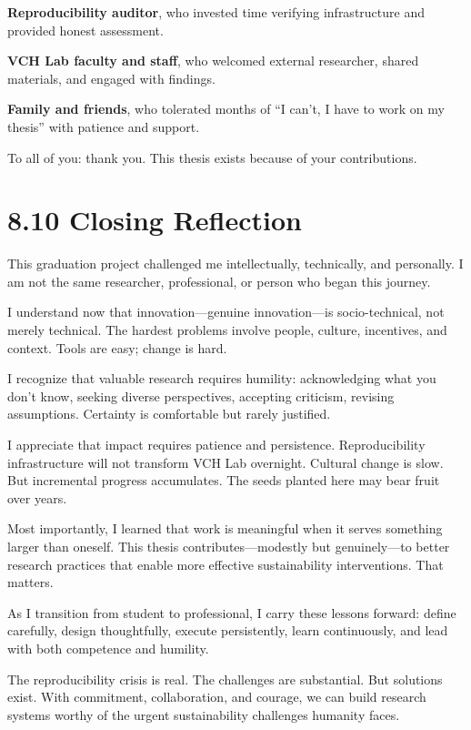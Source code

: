 \documentclass[
  oneside,
  open=any]{scrbook}
\begin{document}
\textbf{Reproducibility auditor}, who invested time verifying
infrastructure and provided honest assessment.

\textbf{VCH Lab faculty and staff}, who welcomed external researcher,
shared materials, and engaged with findings.

\textbf{Family and friends}, who tolerated months of ``I can't, I have
to work on my thesis'' with patience and support.

To all of you: thank you. This thesis exists because of your
contributions.

\section{8.10 Closing Reflection}\label{closing-reflection}

This graduation project challenged me intellectually, technically, and
personally. I am not the same researcher, professional, or person who
began this journey.

I understand now that innovation---genuine innovation---is
socio-technical, not merely technical. The hardest problems involve
people, culture, incentives, and context. Tools are easy; change is
hard.

I recognize that valuable research requires humility: acknowledging what
you don't know, seeking diverse perspectives, accepting criticism,
revising assumptions. Certainty is comfortable but rarely justified.

I appreciate that impact requires patience and persistence.
Reproducibility infrastructure will not transform VCH Lab overnight.
Cultural change is slow. But incremental progress accumulates. The seeds
planted here may bear fruit over years.

Most importantly, I learned that work is meaningful when it serves
something larger than oneself. This thesis contributes---modestly but
genuinely---to better research practices that enable more effective
sustainability interventions. That matters.

As I transition from student to professional, I carry these lessons
forward: define carefully, design thoughtfully, execute persistently,
learn continuously, and lead with both competence and humility.

The reproducibility crisis is real. The challenges are substantial. But
solutions exist. With commitment, collaboration, and courage, we can
build research systems worthy of the urgent sustainability challenges
humanity faces.
\end{document}
